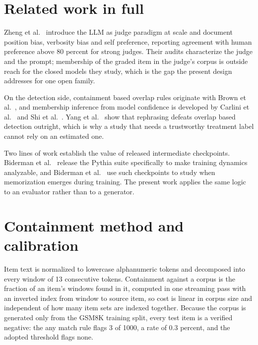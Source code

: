 \documentclass{article}
\begin{document}



\newpage
\appendix

\section{Related work in full}

Zheng et al.~\citep{zheng2023judging} introduce the LLM as judge paradigm at scale and
document position bias, verbosity bias and self preference, reporting agreement with human
preference above 80 percent for strong judges. Their audits characterize the judge and the
prompt; membership of the graded item in the judge's corpus is outside reach for the closed
models they study, which is the gap the present design addresses for one open family.

On the detection side, containment based overlap rules originate with
Brown et al.~\citep{brown2020fewshot}, and membership inference from model confidence is
developed by Carlini et al.~\citep{carlini2023quantifying} and
Shi et al.~\citep{shi2024detecting}. Yang et al.~\citep{yang2023rephrased} show that
rephrasing defeats overlap based detection outright, which is why a study that needs a
trustworthy treatment label cannot rely on an estimated one.

Two lines of work establish the value of released intermediate checkpoints.
Biderman et al.~\citep{biderman2023pythia} release the Pythia suite specifically to make
training dynamics analyzable, and Biderman et al.~\citep{biderman2023emergent} use such
checkpoints to study when memorization emerges during training. The present work applies the
same logic to an evaluator rather than to a generator.

\section{Containment method and calibration}

Item text is normalized to lowercase alphanumeric tokens and decomposed into every window of
13 consecutive tokens. Containment against a corpus is the fraction of an item's windows
found in it, computed in one streaming pass with an inverted index from window to source
item, so cost is linear in corpus size and independent of how many item sets are indexed
together. Because the corpus is generated only from the GSM8K training split, every test item
is a verified negative: the any match rule flags 3 of 1000, a rate of 0.3 percent, and the
adopted threshold flags none.
\end{document}
